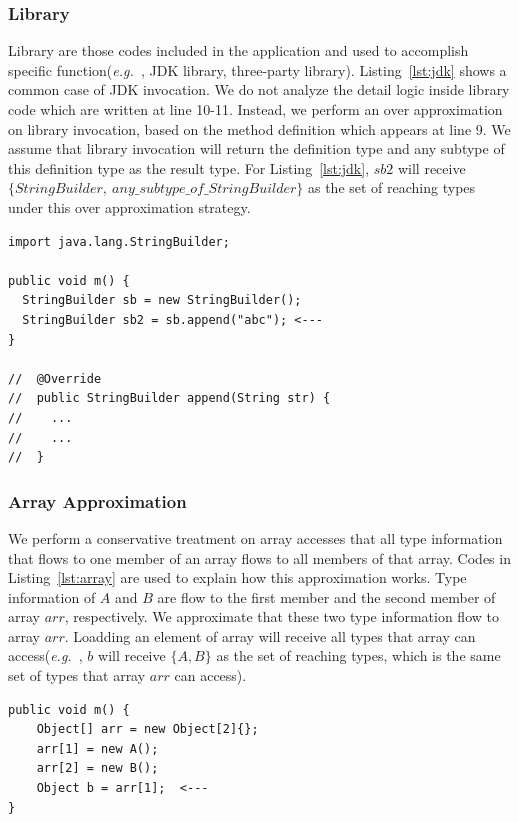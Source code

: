 \documentclass{fac}
\newcommand\eg{\textit{e.g.\ }}
\begin{document}
\subsubsection{Library}\label{subsubsec:library}
Library are those codes included in the application and used to accomplish specific function(\eg, JDK library, three-party library). Listing~\ref{lst:jdk} shows a common case of JDK invocation. We do not analyze the detail logic inside library code which are written at line 10-11. Instead, we perform an over approximation on library invocation, based on the method definition which appears at line 9. We assume that library invocation will return the definition type and any subtype of this definition type as the result type. For Listing~\ref{lst:jdk}, $sb2$ will receive $\{StringBuilder,\ any\_subtype\_of\_StringBuilder\}$ as the set of reaching types under this over approximation strategy.

\begin{minipage}{\linewidth}
\vspace{10pt}
\begin{lstlisting}[caption={Example of JDK library call},label={lst:jdk}]
import java.lang.StringBuilder;

public void m() {
  StringBuilder sb = new StringBuilder();
  StringBuilder sb2 = sb.append("abc"); <---
}

//  @Override
//  public StringBuilder append(String str) {
//    ...
//    ...
//  }
\end{lstlisting}
\end{minipage}

\subsubsection{Array Approximation}\label{subsubsec:array-approximation}
We perform a conservative treatment on array accesses that all type information that flows to one member of an array flows to all members of that array. Codes in Listing~\ref{lst:array} are used to explain how this approximation works. Type information of $A$ and $B$ are flow to the first member and the second member of array $arr$, respectively. We approximate that these two type information flow to array $arr$. Loadding an element of array will receive all types that array can access(\eg, $b$ will receive $\{A, B\}$ as the set of reaching types, which is the same set of types that array $arr$ can access).

\begin{minipage}{\linewidth}
\vspace{10pt}
\begin{lstlisting}[caption={Example of array access},label={lst:array}]
public void m() {
	Object[] arr = new Object[2]{};
	arr[1] = new A();
	arr[2] = new B();
	Object b = arr[1];  <---
}
\end{lstlisting}
\end{minipage}
\end{document}
